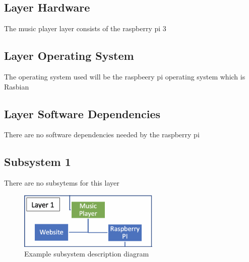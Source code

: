 
\subsection{Layer Hardware}
The music player layer consists of the raspberry pi 3

\subsection{Layer Operating System}
The operating system used will be the raspbeery pi operating system which is Rasbian

\subsection{Layer Software Dependencies}
There are no software dependencies needed by the raspberry pi

\subsection{Subsystem 1}
There are no subsytems for this layer 

\begin{figure}[h!]
	\centering
 	\includegraphics[width=0.60\textwidth]{architectural design specification latex/images/subsystem1.png}
 \caption{Example subsystem description diagram}
\end{figure}




